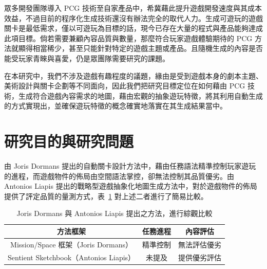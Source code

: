 眾多開發團隊導入 PCG 技術至自家產品中，希冀藉此提升遊戲開發速度與其成本效益，不過目前的程序化生成技術還沒有辦法完全的取代人力。生成可遊玩的遊戲關卡是最低需求，僅以可遊玩為目標的話，現今已存在大量的程式與產品能夠達成此項目標。倘若需要兼顧內容品質與數量，那麼符合玩家遊戲體驗期待的 PCG 方法就顯得相當稀少，甚至只能針對特定的遊戲主題或產品。且隨機生成的內容是否能受玩家青睞與喜愛，仍是眾團隊需要研究的課題。

在本研究中，我們不涉及遊戲有趣程度的議題，緣由是受到遊戲本身的劇本主題、美術設計與關卡企劃等不同面向，因此我們把研究目標定位在如何藉由 PCG 技術，生成符合遊戲內容需求的地圖，藉由宏觀的抽象遊玩特徵，將其利用自動生成的方式實現出，並確保遊玩特徵的概念確實地落實在其生成結果當中。





\section{研究目的與研究問題}

由 Joris Dormans 提出的自動關卡設計方法中，藉由任務語法精準控制玩家遊玩的進程，而遊戲物件的佈局由空間語法掌控，卻無法控制其品質優劣。由 Antonios Liapis 提出的戰略型遊戲抽象化地圖生成方法中，對於遊戲物件的佈局提供了評定品質的量測方式，表~\ref{tbl:compare-the-method-form-jd-and-al} 對上述二者進行了簡易比較。

\begin{table}[!htb]
  \centering
  \caption{Joris Dormans 與 Antonios Liapis 提出之方法，進行綜觀比較}
  \label{tbl:compare-the-method-form-jd-and-al}
  \bigskip
  \begin{tabular}{ | c | c | c | }
    \hline
    方法框架                               & 任務進程 & 內容評估     \\\hline
    Mission/Space 框架（Joris Dormans）    & 精準控制 & 無法評估優劣 \\\hline
    Sentient Sketchbook（Antonios Liapis） & 未提及   & 提供優劣評估 \\\hline
  \end{tabular}
\end{table}

